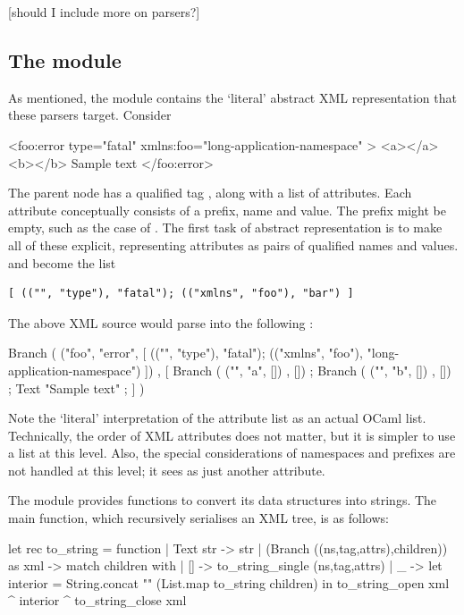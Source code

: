 \documentclass[12pt,a4paper,twoside,openright]{report}
\begin{document}
{[should I include more on parsers?]

\subsection{The  module}
As mentioned, the  module contains the `literal' abstract XML representation that these parsers target. Consider

\begin{xml}[label={lst:xmlsample}]
<foo:error type="fatal" xmlns:foo="long-application-namespace" >
  <a></a>
  <b></b>
  Sample text
</foo:error>
\end{xml}

The parent node has a qualified tag , along with a list of attributes. Each attribute conceptually consists of a prefix, name and value. The prefix might be empty, such as the case of . The first task of abstract representation is to make all of these explicit, representing attributes as pairs of qualified names and values.  and  become the list
\begin{lstlisting}
[ (("", "type"), "fatal"); (("xmlns", "foo"), "bar") ]
\end{lstlisting}
The above XML source would parse into the following :

\begin{ocaml}
Branch ( ("foo", "error", [
    (("", "type"), "fatal");
    (("xmlns", "foo"), "long-application-namespace")
  ]) , [
    Branch ( ("", "a", []) , []) ;
    Branch ( ("", "b", []) , []) ;
    Text "Sample text" ;
] )
\end{ocaml}

Note the `literal' interpretation of the attribute list as an actual OCaml list. Technically, the order of XML attributes does not matter, but it is simpler to use a list at this level. Also, the special considerations of namespaces and prefixes are not handled at this level; it sees  as just another attribute.

The  module provides functions to convert its data structures into strings. The main  function, which recursively serialises an XML tree, is as follows:

\begin{ocaml}
let rec to_string = function
  | Text str -> str
  | (Branch ((ns,tag,attrs),children)) as xml ->
    match children with
    | [] -> to_string_single (ns,tag,attrs)
    | _  -> let interior = String.concat "" (List.map to_string children) in
            to_string_open xml ^ interior ^ to_string_close xml
\end{ocaml}

}
\end{document}
